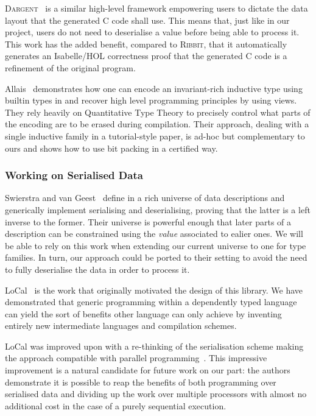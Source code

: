 \textsc{Dargent}~\citep{DBLP:journals/pacmpl/ChenLOKMJR23} is a similar
high-level framework empowering users to dictate the data layout
that the generated C code shall use.
%
This means that, just like in our project, users do not need to
deserialise a value before being able to process it.
%
This work has the added benefit, compared to \textsc{Ribbit}, that
it automatically generates an Isabelle/HOL correctness proof that
the generated C code is a refinement of the original program.


Allais~\citeyearpar{DBLP:conf/esop/Allais23}
demonstrates how one can encode an
invariant-rich inductive type using builtin types
in \idris{} and recover high level programming principles
by using views.
%
They rely heavily on Quantitative Type Theory to precisely
control what parts of the encoding are to be erased during
compilation.
%
Their approach, dealing with a single inductive family in a
tutorial-style paper, is ad-hoc but complementary to ours
and shows how to use bit packing in a certified way.

\subsubsection{Working on Serialised Data}

Swierstra and van Geest~\citeyearpar{DBLP:conf/icfp/GeestS17}
define in \agda{} a rich universe of data descriptions
and generically implement serialising and deserialising,
proving that the latter is a left inverse to the former.
%
Their universe is powerful enough that later parts of a
description can be constrained using the \emph{value}
associated to ealier ones.
%
We will be able to rely on this work when extending our
current universe to one for type families.
%
In turn, our approach could be ported to their setting
to avoid the need to fully deserialise the data in order
to process it.


LoCal~\citep{DBLP:conf/pldi/VollmerKRS0N19} is the work that originally
motivated the design of this library.
%
We have demonstrated that generic programming within a dependently typed
language can yield the sort of benefits other language can only achieve
by inventing entirely new intermediate languages and compilation schemes.

LoCal was improved upon with a re-thinking of the serialisation scheme
making the approach compatible with parallel
programming~\citep{DBLP:journals/pacmpl/KoparkarRVKN21}.
This impressive improvement is a natural candidate for future work on our
part: the authors demonstrate it is possible to reap the benefits of
both programming over serialised data
and dividing up the work over multiple processors
with almost no additional cost in the case of a purely sequential execution.

